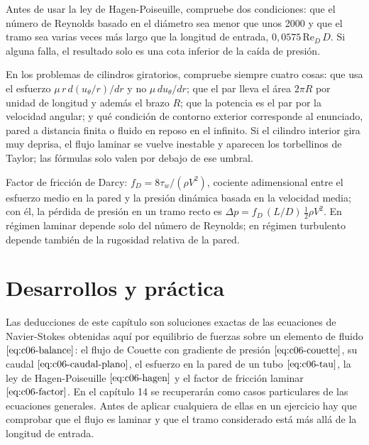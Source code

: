 \documentclass[10pt,openany]{book}
\begin{document}
\begin{tcolorbox}[title={Consejo}, studiumtip, breakable]

Antes de usar la ley de Hagen-Poiseuille, compruebe dos condiciones: que el número de Reynolds basado en el diámetro sea menor que unos 2000 y que el tramo sea varias veces más largo que la longitud de entrada, \(0{,}0575\,\mathrm{Re}_D\,D\). Si alguna falla, el resultado solo es una cota inferior de la caída de presión.

En los problemas de cilindros giratorios, compruebe siempre cuatro cosas: que usa el esfuerzo \(\mu\,r\,d(u_\theta/r)/dr\) y no \(\mu\,du_\theta/dr\); que el par lleva el área \(2\pi R\) por unidad de longitud y además el brazo \(R\); que la potencia es el par por la velocidad angular; y qué condición de contorno exterior corresponde al enunciado, pared a distancia finita o fluido en reposo en el infinito. Si el cilindro interior gira muy deprisa, el flujo laminar se vuelve inestable y aparecen los torbellinos de Taylor; las fórmulas solo valen por debajo de ese umbral.
\end{tcolorbox}

\begin{tcolorbox}[title={Definición}, studiumdef, breakable]

Factor de fricción de Darcy: \(f_D = 8\tau_w/(\rho V^{2})\), cociente adimensional entre el esfuerzo medio en la pared y la presión dinámica basada en la velocidad media; con él, la pérdida de presión en un tramo recto es \(\Delta p = f_D\,(L/D)\,\tfrac12\rho V^{2}\). En régimen laminar depende solo del número de Reynolds; en régimen turbulento depende también de la rugosidad relativa de la pared.
\end{tcolorbox}





\section{Desarrollos y práctica}

Las deducciones de este capítulo son soluciones exactas de las ecuaciones de Navier-Stokes obtenidas aquí por equilibrio de fuerzas sobre un elemento de fluido \(\eqref{eq:c06-balance}\): el flujo de Couette con gradiente de presión \(\eqref{eq:c06-couette}\), su caudal \(\eqref{eq:c06-caudal-plano}\), el esfuerzo en la pared de un tubo \(\eqref{eq:c06-tau}\), la ley de Hagen-Poiseuille \(\eqref{eq:c06-hagen}\) y el factor de fricción laminar \(\eqref{eq:c06-factor}\). En el capítulo 14 se recuperarán como casos particulares de las ecuaciones generales. Antes de aplicar cualquiera de ellas en un ejercicio hay que comprobar que el flujo es laminar y que el tramo considerado está más allá de la longitud de entrada.
\end{document}
